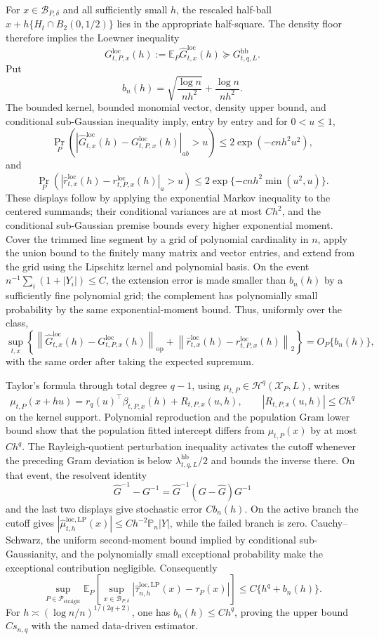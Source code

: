 For \(x\in\mathcal B_{P,\delta}\) and all sufficiently small \(h\), the rescaled half-ball \(x+h\{H_t\cap B_2(0,1/2)\}\) lies in the appropriate half-square.  The density floor therefore implies the Loewner inequality
\[
 G^{\mathrm{loc}}_{t,P,x}(h)
 :=\mathbb E_P\widehat G^{\mathrm{loc}}_{t,x}(h)
 \succeq G^{\mathrm{hb}}_{t,q,L}.
\]
Put
\[
 b_n(h)=\sqrt{\frac{\log n}{nh^2}}+\frac{\log n}{nh^2}.
\]
The bounded kernel, bounded monomial vector, density upper bound, and conditional sub-Gaussian inequality imply, entry by entry and for \(0<u\leq1\),
\[
 \Pr_P\!\left(
 \left|\widehat G^{\mathrm{loc}}_{t,x}(h)-G^{\mathrm{loc}}_{t,P,x}(h)\right|_{ab}>u
 \right)
 \leq2\exp(-cnh^2u^2),
\]
and
\[
 \Pr_P\!\left(
 \left|\widehat r^{\mathrm{loc}}_{t,x}(h)-r^{\mathrm{loc}}_{t,P,x}(h)\right|_a>u
 \right)
 \leq2\exp\{-cnh^2\min(u^2,u)\}.
\]
These displays follow by applying the exponential Markov inequality to the centered summands; their conditional variances are at most \(Ch^2\), and the conditional sub-Gaussian premise bounds every higher exponential moment.  Cover the trimmed line segment by a grid of polynomial cardinality in \(n\), apply the union bound to the finitely many matrix and vector entries, and extend from the grid using the Lipschitz kernel and polynomial basis.  On the event \(n^{-1}\sum_i(1+|Y_i|)\leq C\), the extension error is made smaller than \(b_n(h)\) by a sufficiently fine polynomial grid; the complement has polynomially small probability by the same exponential-moment bound.  Thus, uniformly over the class,
\[
 \sup_{t,x}\left\{
 \left\|\widehat G^{\mathrm{loc}}_{t,x}(h)-G^{\mathrm{loc}}_{t,P,x}(h)\right\|_{\mathrm{op}}
 +\left\|\widehat r^{\mathrm{loc}}_{t,x}(h)-r^{\mathrm{loc}}_{t,P,x}(h)\right\|_2
 \right\}=O_P\{b_n(h)\},
\]
with the same order after taking the expected supremum.

Taylor's formula through total degree \(q-1\), using \(\mu_{t,P}\in\mathcal H^q(\mathcal X_P,L)\), writes
\[
 \mu_{t,P}(x+hu)=r_q(u)^\top\beta_{t,P,x}(h)+R_{t,P,x}(u,h),
 \qquad |R_{t,P,x}(u,h)|\leq Ch^q
\]
on the kernel support.  Polynomial reproduction and the population Gram lower bound show that the population fitted intercept differs from \(\mu_{t,P}(x)\) by at most \(Ch^q\).  The Rayleigh-quotient perturbation inequality activates the cutoff whenever the preceding Gram deviation is below \(\lambda^{\mathrm{hb}}_{t,q,L}/2\) and bounds the inverse there.  On that event, the resolvent identity
\[
 \widehat G^{-1}-G^{-1}
 =\widehat G^{-1}(G-\widehat G)G^{-1}
\]
and the last two displays give stochastic error \(Cb_n(h)\).  On the active branch the cutoff gives \(|\widehat\mu^{\mathrm{loc},\mathrm{LP}}_{t,h}(x)|\leq Ch^{-2}\mathbb P_n|Y|\), while the failed branch is zero.  Cauchy--Schwarz, the uniform second-moment bound implied by conditional sub-Gaussianity, and the polynomially small exceptional probability make the exceptional contribution negligible.  Consequently
\[
 \sup_{P\in\mathcal P_{\mathrm{straight}}}
 \mathbb E_P\!\left[
 \sup_{x\in\mathcal B_{P,\delta}}
 |\widehat\tau^{\mathrm{loc},\mathrm{LP}}_{n,h}(x)-\tau_P(x)|
 \right]
 \leq C\{h^q+b_n(h)\}.
\]
For \(h\asymp(\log n/n)^{1/(2q+2)}\), one has \(b_n(h)\leq Ch^q\), proving the upper bound \(Cs_{n,q}\) with the named data-driven estimator.

